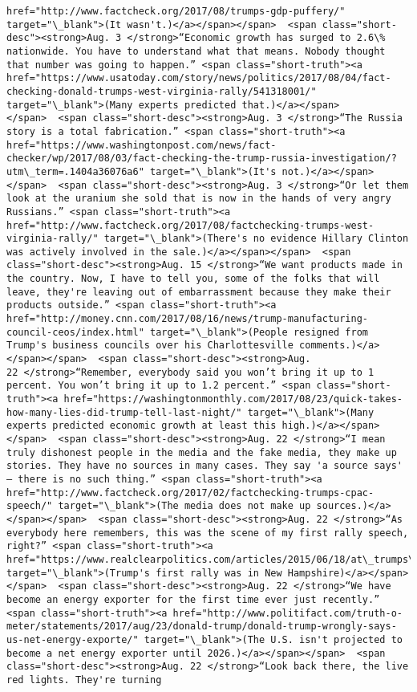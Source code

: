 \documentclass[11pt]{article}
\begin{document}
\begin{Verbatim}[commandchars=\\\{\}]
href="http://www.factcheck.org/2017/08/trumps-gdp-puffery/" target="\_blank">(It wasn't.)</a></span></span>  <span class="short-desc"><strong>Aug. 3 </strong>“Economic growth has surged to 2.6\% nationwide. You have to understand what that means. Nobody thought that number was going to happen.” <span class="short-truth"><a href="https://www.usatoday.com/story/news/politics/2017/08/04/fact-checking-donald-trumps-west-virginia-rally/541318001/" target="\_blank">(Many experts predicted that.)</a></span></span>  <span class="short-desc"><strong>Aug. 3 </strong>“The Russia story is a total fabrication.” <span class="short-truth"><a href="https://www.washingtonpost.com/news/fact-checker/wp/2017/08/03/fact-checking-the-trump-russia-investigation/?utm\_term=.1404a36076a6" target="\_blank">(It's not.)</a></span></span>  <span class="short-desc"><strong>Aug. 3 </strong>“Or let them look at the uranium she sold that is now in the hands of very angry Russians.” <span class="short-truth"><a href="http://www.factcheck.org/2017/08/factchecking-trumps-west-virginia-rally/" target="\_blank">(There's no evidence Hillary Clinton was actively involved in the sale.)</a></span></span>  <span class="short-desc"><strong>Aug. 15 </strong>“We want products made in the country. Now, I have to tell you, some of the folks that will leave, they're leaving out of embarrassment because they make their products outside.” <span class="short-truth"><a href="http://money.cnn.com/2017/08/16/news/trump-manufacturing-council-ceos/index.html" target="\_blank">(People resigned from Trump's business councils over his Charlottesville comments.)</a></span></span>  <span class="short-desc"><strong>Aug. 22 </strong>“Remember, everybody said you won’t bring it up to 1 percent. You won’t bring it up to 1.2 percent.” <span class="short-truth"><a href="https://washingtonmonthly.com/2017/08/23/quick-takes-how-many-lies-did-trump-tell-last-night/" target="\_blank">(Many experts predicted economic growth at least this high.)</a></span></span>  <span class="short-desc"><strong>Aug. 22 </strong>“I mean truly dishonest people in the media and the fake media, they make up stories. They have no sources in many cases. They say 'a source says'  – there is no such thing.” <span class="short-truth"><a href="http://www.factcheck.org/2017/02/factchecking-trumps-cpac-speech/" target="\_blank">(The media does not make up sources.)</a></span></span>  <span class="short-desc"><strong>Aug. 22 </strong>“As everybody here remembers, this was the scene of my first rally speech, right?” <span class="short-truth"><a href="https://www.realclearpolitics.com/articles/2015/06/18/at\_trumps\_nh\_rally\_true\_believers\_and\_big\_fans\_127030.html" target="\_blank">(Trump's first rally was in New Hampshire)</a></span></span>  <span class="short-desc"><strong>Aug. 22 </strong>“We have become an energy exporter for the first time ever just recently.” <span class="short-truth"><a href="http://www.politifact.com/truth-o-meter/statements/2017/aug/23/donald-trump/donald-trump-wrongly-says-us-net-energy-exporte/" target="\_blank">(The U.S. isn't projected to become a net energy exporter until 2026.)</a></span></span>  <span class="short-desc"><strong>Aug. 22 </strong>“Look back there, the live red lights. They're turning 
\end{Verbatim}
\end{document}
